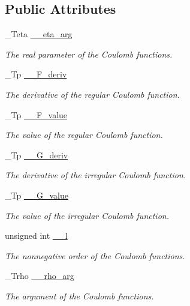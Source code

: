 \subsection*{Public Attributes}
\begin{DoxyCompactItemize}
\item 
\+\_\+\+Teta \hyperlink{struct____gnu__cxx_1_1____coulomb__t_a174cc4a53442bfcd626bc07e1cba0162}{\+\_\+\+\_\+eta\+\_\+arg}
\begin{DoxyCompactList}\small\item\em The real parameter of the Coulomb functions. \end{DoxyCompactList}\item 
\+\_\+\+Tp \hyperlink{struct____gnu__cxx_1_1____coulomb__t_aab53d7d33fa9ba365222957dca6941ec}{\+\_\+\+\_\+\+F\+\_\+deriv}
\begin{DoxyCompactList}\small\item\em The derivative of the regular Coulomb function. \end{DoxyCompactList}\item 
\+\_\+\+Tp \hyperlink{struct____gnu__cxx_1_1____coulomb__t_af246b9d73035a2c8aa04038b813610de}{\+\_\+\+\_\+\+F\+\_\+value}
\begin{DoxyCompactList}\small\item\em The value of the regular Coulomb function. \end{DoxyCompactList}\item 
\+\_\+\+Tp \hyperlink{struct____gnu__cxx_1_1____coulomb__t_a806017e10d24a36b075d1c0c074bc274}{\+\_\+\+\_\+\+G\+\_\+deriv}
\begin{DoxyCompactList}\small\item\em The derivative of the irregular Coulomb function. \end{DoxyCompactList}\item 
\+\_\+\+Tp \hyperlink{struct____gnu__cxx_1_1____coulomb__t_a8449f7f993705fa16300ba3996d1ea28}{\+\_\+\+\_\+\+G\+\_\+value}
\begin{DoxyCompactList}\small\item\em The value of the irregular Coulomb function. \end{DoxyCompactList}\item 
unsigned int \hyperlink{struct____gnu__cxx_1_1____coulomb__t_a27fc4d32a00cb63b64e352a162c999d0}{\+\_\+\+\_\+l}
\begin{DoxyCompactList}\small\item\em The nonnegative order of the Coulomb functions. \end{DoxyCompactList}\item 
\+\_\+\+Trho \hyperlink{struct____gnu__cxx_1_1____coulomb__t_ae279212b8d75f82d050394be1744600c}{\+\_\+\+\_\+rho\+\_\+arg}
\begin{DoxyCompactList}\small\item\em The argument of the Coulomb functions. \end{DoxyCompactList}\end{DoxyCompactItemize}


